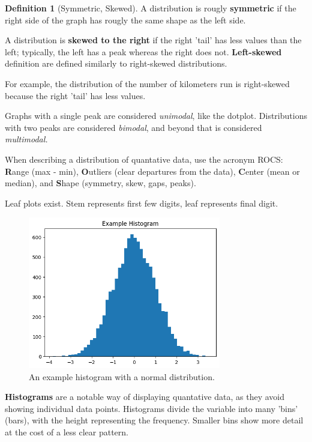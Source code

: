 \documentclass[12pt, a4paper]{article}
\theoremstyle{definition}
\newtheorem{definition}{Definition}
\begin{document}
\begin{definition}[Symmetric, Skewed]
    A distribution is rougly \textbf{symmetric} if the right side of the graph has rougly the same shape as the left side.
    
    A distribution is \textbf{skewed to the right} if the right 'tail' has less values than the left; typically, the left has a peak whereas the right does not.
    \textbf{Left-skewed} definition are defined similarly to right-skewed distributions.
\end{definition}

For example, the distribution of the number of kilometers run is right-skewed because the right 'tail' has less values.

Graphs with a single peak are considered \emph{unimodal}, like the dotplot. Distributions with two peaks are considered \emph{bimodal}, and beyond that is considered \emph{multimodal.}

When describing a distribution of quantative data, use the acronym ROCS: \textbf{R}ange (max - min), \textbf{O}utliers (clear departures from the data), \textbf{C}enter (mean or median), and \textbf{S}hape (symmetry, skew, gaps, peaks).

Leaf plots exist. Stem represents first few digits, leaf represents final digit.

\begin{figure}[t]
    \centering
    \includegraphics[width=0.75\textwidth]{histogram.png}
    \caption{An example histogram with a normal distribution.}
    \label{fig:histogram}
\end{figure}

\textbf{Histograms} are a notable way of displaying quantative data, as they avoid showing individual data points.
Histograms divide the variable into many 'bins' (bars), with the height representing the frequency. Smaller bins show more detail at the cost of a less clear pattern.
\end{document}
